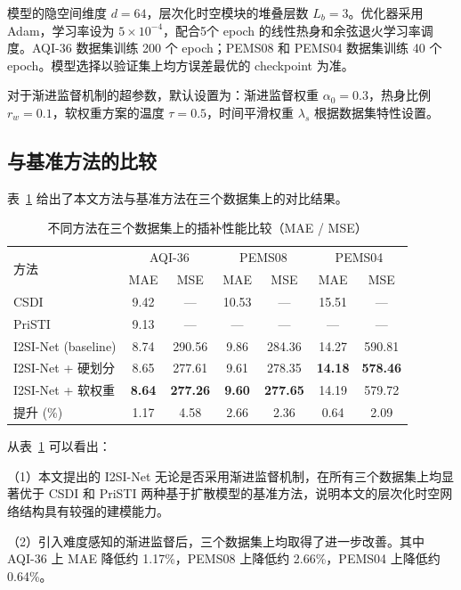 模型的隐空间维度 $d=64$，层次化时空模块的堆叠层数 $L_b=3$。优化器采用 Adam，学习率设为 $5\times10^{-4}$，配合5个 epoch 的线性热身和余弦退火学习率调度。AQI-36 数据集训练 200 个 epoch；PEMS08 和 PEMS04 数据集训练 40 个 epoch。模型选择以验证集上均方误差最优的 checkpoint 为准。

对于渐进监督机制的超参数，默认设置为：渐进监督权重 $\alpha_0=0.3$，热身比例 $r_w=0.1$，软权重方案的温度 $\tau=0.5$，时间平滑权重 $\lambda_s$ 根据数据集特性设置。

\subsection{与基准方法的比较}

表~\ref{tab:main_results} 给出了本文方法与基准方法在三个数据集上的对比结果。

\begin{table}[htbp]
\centering
\caption{\label{tab:main_results}不同方法在三个数据集上的插补性能比较（MAE / MSE）}
\begin{tabular}{l|cc|cc|cc}
\toprule
\multirow{2}{*}{方法} & \multicolumn{2}{c|}{AQI-36} & \multicolumn{2}{c|}{PEMS08} & \multicolumn{2}{c}{PEMS04} \\
 & MAE & MSE & MAE & MSE & MAE & MSE \\
\midrule
CSDI & 9.42 & — & 10.53 & — & 15.51 & — \\
PriSTI & 9.13 & — & — & — & — & — \\
I2SI-Net (baseline) & 8.74 & 290.56 & 9.86 & 284.36 & 14.27 & 590.81 \\
I2SI-Net + 硬划分 & 8.65 & 277.61 & 9.61 & 278.35 & \textbf{14.18} & \textbf{578.46} \\
I2SI-Net + 软权重 & \textbf{8.64} & \textbf{277.26} & \textbf{9.60} & \textbf{277.65} & 14.19 & 579.72 \\
\midrule
提升 (\%) & 1.17 & 4.58 & 2.66 & 2.36 & 0.64 & 2.09 \\
\bottomrule
\end{tabular}
\end{table}

从表~\ref{tab:main_results} 可以看出：

（1）本文提出的 I2SI-Net 无论是否采用渐进监督机制，在所有三个数据集上均显著优于 CSDI 和 PriSTI 两种基于扩散模型的基准方法，说明本文的层次化时空网络结构具有较强的建模能力。

（2）引入难度感知的渐进监督后，三个数据集上均取得了进一步改善。其中 AQI-36 上 MAE 降低约 1.17\%，PEMS08 上降低约 2.66\%，PEMS04 上降低约 0.64\%。

